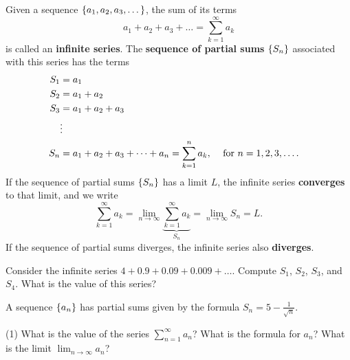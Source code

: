\documentclass[../mathNotesPreamble]{subfiles}
\begin{document}
    \begin{defn*}
      Given a sequence ${\left\{a_1, a_2, a_3,\dots\right\}}$, the sum of its terms
        \[a_1+a_2+a_3+\dots=\sum_{k=1}^\infty a_k\]
      is called an \textbf{infinite series}. The \textbf{sequence of partial sums} ${\left\{S_n\right\}}$ associated with this series has the terms
        \begin{align*}
          S_1&=a_1\\
          S_2&=a_1+a_2\\
          S_3&=a_1+a_2+a_3\\
          &\vdots\\
          S_n&=a_1+a_2+a_3+\dots+a_n=\sum_{k=1}^n a_k, &&\textnormal{ for } n=1,2,3,\dots.
        \end{align*}
      If the sequence of partial sums ${\left\{S_n\right\}}$ has a limit $L$, the infinite series \textbf{converges} to that limit, and we write
        \[\sum_{k=1}^\infty a_k=\lim_{n\to \infty}\underbrace{\sum_{k=1}^\infty a_k}_{S_n}=\lim_{n\to \infty}S_n=L.\]
      If the sequence of partial sums diverges, the infinite series also \textbf{diverges}.
    \end{defn*}
    \pagebreak

    \begin{ex*}
      Consider the infinite series $4+0.9+0.09+0.009+\dots$. Compute $S_1$, $S_2$, $S_3$, and $S_4$. What is the value of this series?
    \end{ex*}
    \pagebreak

    \begin{ex*}
      A sequence ${\left\{a_n\right\}}$ has partial sums given by the formula $S_n=5-\frac{1}{\sqrt{n}}$. 
    \end{ex*}
    \begin{tasks}[after-item-skip=\stretch{1}, label=, item-indent=0pt](1)
      \task What is the value of the series $\displaystyle\sum_{n=1}^\infty a_n$?
      \task What is the formula for $a_n$?
      \task What is the limit $\displaystyle\lim_{n\to \infty} a_n$?
    \end{tasks}
    \pagebreak
\end{document}
